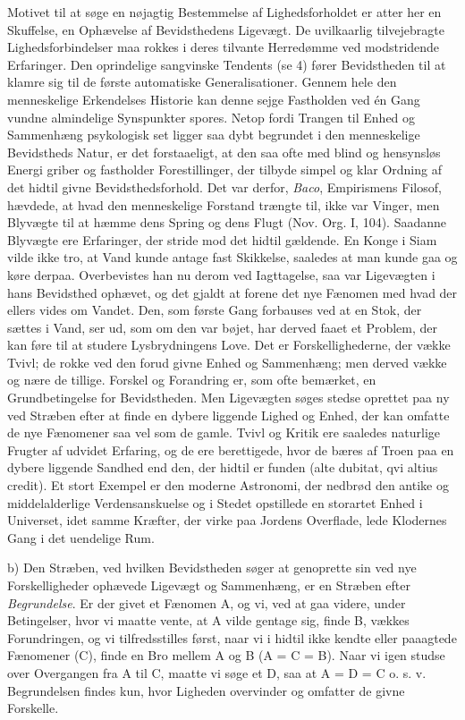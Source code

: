 \documentclass[12pt,a4paper,openany]{book}
\newcommand{\opage}[1]{\marginnote{\footnotesize\textit{[#1]}}}
\begin{document}
Motivet til at søge en nøjagtig Bestemmelse af Lighedsforholdet er atter
her en Skuffelse, en Ophævelse af Bevidsthedens Ligevægt. De uvilkaarlig
tilvejebragte Lighedsforbindelser maa rokkes i deres tilvante Herredømme
ved modstridende Erfaringer. Den oprindelige sangvinske Tendents (se 4)
fører Bevidstheden til at klamre sig til de første automatiske
Generalisationer. Gennem hele den menneskelige Erkendelses Historie kan
denne sejge Fastholden ved én Gang vundne almindelige Synspunkter
spores. Netop fordi Trangen til Enhed og Sammenhæng psykologisk set
ligger saa dybt begrundet i den menneskelige Bevidstheds Natur, er det
forstaaeligt, at den saa ofte med blind og hensynsløs Energi griber og
fastholder Forestillinger, der tilbyde simpel og klar Ordning af det
hidtil givne Bevidsthedsforhold. Det var derfor, \emph{Baco},
Empirismens Filosof, hævdede, at hvad den menneskelige Forstand trængte
til, ikke var Vinger, men Blyvægte til at hæmme dens Spring og dens
Flugt (Nov. Org. I, 104). Saadanne Blyvægte ere Erfaringer, der stride
mod det hidtil gældende. En Konge i Siam vilde ikke tro, at Vand kunde
\opage{212}antage fast Skikkelse, saaledes at man kunde gaa og køre
derpaa. Overbevistes han nu derom ved Iagttagelse, saa var Ligevægten i
hans Bevidsthed ophævet, og det gjaldt at forene det nye Fænomen med
hvad der ellers vides om Vandet. Den, som første Gang forbauses ved at
en Stok, der sættes i Vand, ser ud, som om den var bøjet, har derved
faaet et Problem, der kan føre til at studere Lysbrydningens Love. Det
er Forskellighederne, der vække Tvivl; de rokke ved den forud givne
Enhed og Sammenhæng; men derved vække og nære de tillige. Forskel og
Forandring er, som ofte bemærket, en Grundbetingelse for Bevidstheden.
Men Ligevægten søges stedse oprettet paa ny ved Stræben efter at finde
en dybere liggende Lighed og Enhed, der kan omfatte de nye Fænomener saa
vel som de gamle. Tvivl og Kritik ere saaledes naturlige Frugter af
udvidet Erfaring, og de ere berettigede, hvor de bæres af Troen paa en
dybere liggende Sandhed end den, der hidtil er funden (alte dubitat, qvi
altius credit). Et stort Exempel er den moderne Astronomi, der nedbrød
den antike og middelalderlige Verdensanskuelse og i Stedet opstillede en
storartet Enhed i Universet, idet samme Kræfter, der virke paa Jordens
Overflade, lede Klodernes Gang i det uendelige Rum.

b) Den Stræben, ved hvilken Bevidstheden søger at genoprette sin ved nye
Forskelligheder ophævede Ligevægt og Sammenhæng, er en Stræben efter
\emph{Begrundelse}. Er der givet et Fænomen A, og vi, ved at gaa videre,
under Betingelser, hvor vi maatte vente, at A vilde gentage sig, finde
B, vækkes Forundringen, og vi tilfredsstilles først, naar vi i hidtil
ikke kendte eller paaagtede Fænomener (C), finde en Bro mellem A og B (A
= C = B). Naar vi igen studse over Overgangen fra A til C, maatte vi
søge et D, saa at A = D = C o. s. v. Begrundelsen findes kun, hvor
Ligheden overvinder og omfatter de givne Forskelle.
\end{document}
